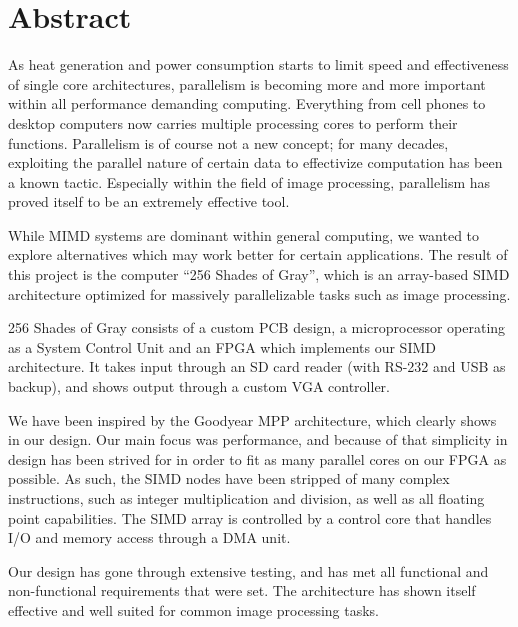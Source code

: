 \begingroup
\let\clearpage\relax
\let\cleardoublepage\relax
\let\cleardoublepage\relax

\chapter*{Abstract}
As heat generation and power consumption starts to limit speed and effectiveness
of single core architectures, parallelism is becoming more and more important
within all performance demanding computing. Everything from cell phones to
desktop computers now carries multiple processing cores to perform their
functions. Parallelism is of course not a new concept; for many decades,
exploiting the parallel nature of certain data to effectivize computation has
been a known tactic. Especially within the field of image processing,
parallelism has proved itself to be an extremely effective tool.

While MIMD systems are dominant within general computing, we wanted to explore
alternatives which may work better for certain applications. The result of this
project is the computer ``256 Shades of Gray'', which is
an array-based SIMD architecture optimized for massively parallelizable tasks
such as image processing.

256 Shades of Gray consists of a custom PCB design, a microprocessor operating
as a System Control Unit and an FPGA which implements our SIMD architecture. It
takes input through an SD card reader (with RS-232 and USB as backup), and shows
output through a custom VGA controller.

We have been inspired by the Goodyear MPP architecture, which clearly shows in
our design. Our main focus was performance, and because of that simplicity in
design has been strived for in order to fit as many parallel cores on our FPGA
as possible. As such, the SIMD nodes have been stripped of many
complex instructions, such as integer multiplication and division, as well as
all floating point capabilities. The SIMD array is controlled by a control core
that handles I/O and memory access through a DMA unit.

Our design has gone through extensive testing, and has met all functional and
non-functional requirements that were set. The architecture has shown itself
effective and well suited for common image processing tasks.
\endgroup
